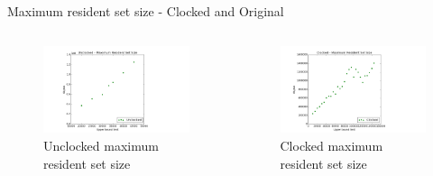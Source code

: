 \documentclass[11pt]{beamer}
\begin{document}
\begin{frame}{Maximum resident set size - Clocked and Original}
         \begin{columns}[t, totalwidth=1.02\textwidth]
             \begin{column}{0.50\linewidth}
\begin{figure}[!ht]
     \centering
     \includegraphics[scale=0.28]{figures/unclocked_size.png}
     \caption{Unclocked maximum resident set size}
\end{figure}
             \end{column}

             \begin{column}{0.50\linewidth}
\begin{figure}[!ht]
     \centering
     \includegraphics[scale=0.28]{figures/clocked_size.png}
     \caption{Clocked maximum resident set size}
\end{figure}
             \end{column}

         \end{columns}
\end{frame}
\end{document}
